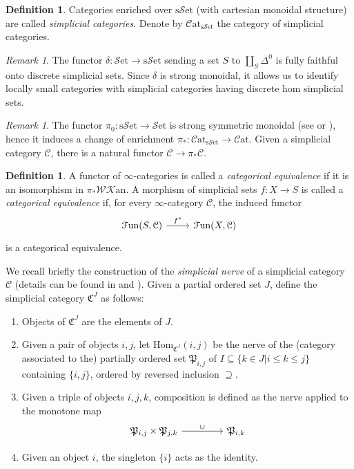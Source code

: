 \documentclass[a4paper]{book}
\newcommand{\lC}{\mathcal{C}}
\newcommand{\kC}{\mathfrak{C}}
\newcommand{\lF}{\mathcal{F}}
\newcommand{\lK}{\mathcal{K}}
\newcommand{\kP}{\mathfrak{P}}
\newcommand{\lS}{\mathcal{S}}
\newcommand{\lW}{\mathcal{W}}
\newcommand{\set}{\lS\mathrm{et}} %
\newcommand{\cat}{\lC\mathrm{at}} %
\newcommand{\Fun}{\lF\mathrm{un}} %
\newcommand{\sset}{\mathrm{s}\set} %
\newcommand{\Kan}{\lK\mathrm{an}} %
\newcommand{\WKan}{\lW\Kan} %
\renewcommand{\hom}{\mathrm{Hom}} %
\theoremstyle{definition}
\newtheorem{definition}[equation]{Definition}
\theoremstyle{remark}
\newtheorem{remark}[equation]{Remark}
\numberwithin{equation}{section}
\begin{document}
\begin{definition}
	Categories enriched over $\sset$ (with cartesian monoidal structure) are called \emph{simplicial categories}. Denote by $\cat_{\sset}$ the category of simplicial categories. 
\end{definition}
\begin{remark}
	The functor $\delta:\set\to\sset$ sending a set $S$ to $\coprod_{S}\Delta^0$ is fully faithful onto discrete simplicial sets. Since $\delta$ is strong monoidal, it allows us to identify locally small categories with simplicial categories having discrete hom simplicial sets. 
\end{remark}
\begin{remark}
	The functor $\pi_0:\sset\to\set$ is strong symmetric monoidal (see \cite[Lemma 1.2.47]{land2021introduction} or \cite[Tag 00GX]{kerodon2026}), hence it induces a change of enrichment $\pi_*:\cat_{\sset}\to\cat$. Given a simplicial category $\lC$, there is a natural functor $\lC\to\pi_*\lC$.
\end{remark}
\begin{definition}
	A functor of $\infty$-categories is called a \emph{categorical equivalence} if it is an isomorphism in $\pi_*\WKan$. A morphism of simplicial sets $f:X\to S$ is called a \emph{categorical equivalence} if, for every $\infty$-category $\lC$, the induced functor \begin{equation}
		\begin{tikzcd}
			\Fun(S,\lC) \arrow[r,"f^*"] & \Fun(X,\lC)
		\end{tikzcd}
	\end{equation}is a categorical equivalence. 
\end{definition}
We recall briefly the construction of the \emph{simplicial nerve} of a simplicial category $\lC$ (details can be found in \cite[\S 1.1.5]{lurie2009htt} and \cite[Tag 00KM]{kerodon2026}). Given a partial ordered set $J$, define the simplicial category $\kC^J$ as follows: 
\begin{enumerate}
	\item Objects of $\kC^J$ are the elements of $J$. 
	\item Given a pair of objects $i,j$, let $\hom_{\kC^J}(i,j)$ be the nerve of the (category associated to the) partially ordered set $\kP_{i,j}$ of $I\subseteq\{k\in J|i\leq k\leq j\}$ containing $\{i,j\}$, ordered by reversed inclusion $\supseteq$.
	\item Given a triple of objects $i,j,k$, composition is defined as the nerve applied to the monotone map \begin{equation}
		\begin{tikzcd}[column sep=1.5cm]
			\kP_{i,j}\times\kP_{j,k} \arrow[r,"\cup"] & \kP_{i,k}
		\end{tikzcd}
	\end{equation}
	\item Given an object $i$, the singleton $\{i\}$ acts as the identity. 
\end{enumerate}
\end{document}
